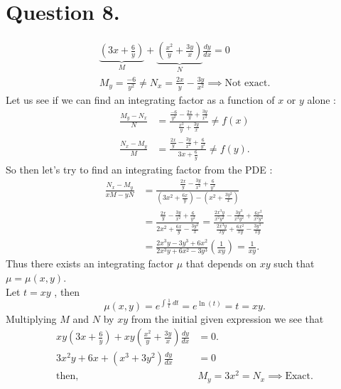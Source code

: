 \documentclass[
	12pt,
	]{article}
\theoremstyle{definition}
\theoremstyle{definition}
\theoremstyle{definition}
\theoremstyle{definition}
\theoremstyle{definition}
\theoremstyle{example}
\theoremstyle{note}
\theoremstyle{remark}
\theoremstyle{example}
\begin{document}
			\section{Question 8.}
			\begin{gather*}
				\underbrace{\left(3x + \frac{6}{y}\right)}_{M} + \underbrace{\left(\frac{x^{2}}{y} + \frac{3y}{x}\right)}_{N}\frac{dy}{dx} = 0\\
				M_{y} = \frac{-6}{y^{2}} \neq N_{x} = \frac{2x}{y} -\frac{3y}{x^{2}} \implies \text{Not exact}.
			\end{gather*}
			Let us see if we can find an integrating factor as a function of $x$ or $y$ alone : 
			\begin{align*}
				\frac{M_{y} - N_{x}}{N} &= \frac{\frac{-6}{y^{2}} - \frac{2x}{y} + \frac{3y}{x^{2}}}{\frac{x^{2}}{y} + \frac{3y}{x}} \neq f(x) \\
				\frac{N_{x} - M_{y}}{M} &= \frac{\frac{2x}{y}- \frac{3y}{x^{2}} + \frac{6}{y^{2}}}{3x + \frac{6}{y}} \neq f(y).
			\end{align*}
			So then let's try to find an integrating factor from the PDE : 
			\begin{align*}
				\frac{N_{x} - M_{y}}{xM - yN} &= \frac{\frac{2x}{y} - \frac{3y}{x^{2}} +\frac{6}{y^{2}}}{\left(3x^{2} + \frac{6x}{y}\right) - \left(x^{2} + \frac{3y^{2}}{x}\right)}\\
				&= \frac{\frac{2x}{y} - \frac{3y}{x^{2}} +\frac{6}{y^{2}}}{2x^{2}+\frac{6x}{y} -\frac{3y^{2}}{x}} 
				= \frac{\frac{2x^{3}y}{x^{2}y^{2}} - \frac{3y^{3}}{x^{2}y^{2}} + \frac{6x^{2}}{x^{2}y^{2}}}{\frac{2x^{3}y}{xy} + \frac{6x^{2}}{xy} -\frac{3y^{3}}{xy}} \\
				&= \frac{2x^{3}y -3y^{3} + 6x^{2}}{2x^{3}y + 6x^{2}-3y^{3}}\left(\frac{1}{xy}\right) = \frac{1}{xy}.
			\end{align*}
			Thus there exists an integrating factor $\mu$ that depends on $xy$ such that $\mu = \mu(x,y)$.\\
			Let $t = xy$ , then 
			\begin{equation*}
				\mu(x,y) = e^{\int \frac{1}{t}\ dt} = e^{\ln(t)} = t = xy.
			\end{equation*}
			Multiplying $M$ and $N$ by $xy$ from the initial given expression we see that 
			\begin{align*}
				xy\left(3x + \frac{6}{y}\right) + xy\left(\frac{x^{2}}{y} + \frac{3y}{x}\right)\frac{dy}{dx} &= 0.\\
				3x^{2}y + 6x + \left(x^{3} + 3y^{2}\right)\frac{dy}{dx} &= 0\\
				\text{then, } \ \ & M_{y} = 3x^{2} = N_{x} \implies \text{Exact}.
			\end{align*}
\end{document}
